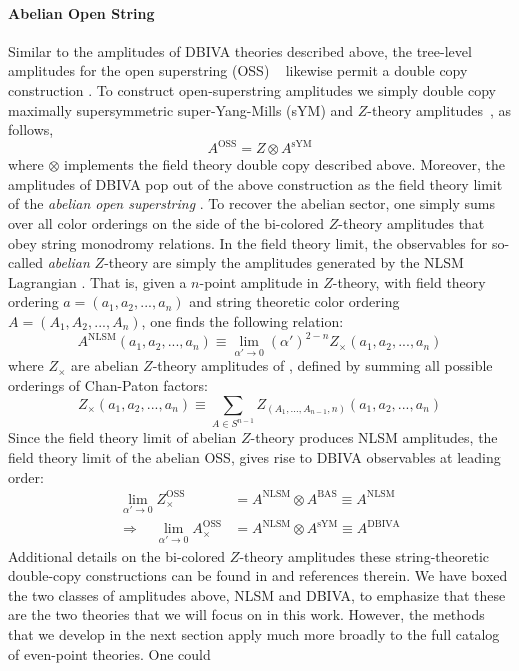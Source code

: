 \documentclass[12pt,letter]{article}
\begin{document}
\paragraph{Abelian Open String}
Similar to the amplitudes of DBIVA theories described above, the tree-level amplitudes for the open superstring (OSS) ~\cite{Mafra:2011nv,Mafra:2011nw} likewise permit a double copy construction \cite{Broedel:2013tta}. To construct open-superstring amplitudes we simply double copy maximally supersymmetric super-Yang-Mills (sYM) and $Z$-theory amplitudes~\cite{Carrasco:2016ldy,Carrasco:2016ygv,Mafra:2016mcc}, as follows,
\begin{equation}
A^{\text{OSS}}= Z \otimes A^{ \text{sYM}}
\end{equation}
where $\otimes$ implements the field theory double copy \cite{KLT, BCJ} described above. Moreover, the amplitudes of DBIVA pop out of the above construction as the field theory limit of the \textit{abelian open superstring} \cite{Green:1982sw}. To recover the abelian sector, one simply sums over all color orderings on the side of the bi-colored $Z$-theory amplitudes that obey string monodromy relations. In the field theory limit, the observables for so-called \textit{abelian} $Z$-theory are simply the amplitudes generated by the NLSM Lagrangian \cite{Carrasco:2016ldy}. That is, given a $n$-point amplitude in $Z$-theory, with field theory ordering $a=(a_1,a_2,...,a_n)$ and string theoretic color ordering $A=(A_1,A_2,...,A_n)$, one finds the following relation:
\begin{equation}
A^{\text{NLSM}}{(a_1,a_2,...,a_n)} \equiv \lim_{\alpha' \to 0} (\alpha')^{2-n}  Z_{\times}{(a_1,a_2,...,a_n)}
\end{equation}
where $Z_{\times}$ are abelian $Z$-theory amplitudes of \cite{Carrasco:2016ldy}, defined by summing all possible orderings of Chan-Paton factors:
\begin{equation}
Z_{\times}(a_1,a_2,...,a_n)\equiv \sum_{A \in S^{n-1}} Z_{(A_1,...,A_{n-1},n)}{(a_1,a_2,...,a_n)}
\end{equation}
Since the field theory limit of abelian $Z$-theory produces NLSM amplitudes, the field theory limit of the abelian OSS, gives rise to DBIVA observables at leading order:
\begin{equation}
\boxed
{\begin{aligned} 
\lim_{\alpha' \to 0 }Z^{\text{OSS}}_{\times}&= A^{\text{NLSM}} \otimes A^{\text{BAS}}\equiv A^{\text{NLSM}}
\\
\Rightarrow \quad\lim_{\alpha' \to 0 }A^{\text{OSS}}_{\times}&= A^{\text{NLSM}} \otimes A^{ \text{sYM}}\equiv A^{\text{DBIVA}}
\end{aligned}}
\end{equation}
Additional details on the bi-colored $Z$-theory amplitudes these string-theoretic double-copy constructions can be found in \cite{Broedel:2013tta,Carrasco:2016ldy,Carrasco:2016ygv,Mafra:2016mcc,Azevedo:2018dgo} and references therein. We have boxed the two classes of amplitudes above, NLSM and DBIVA, to emphasize that these are the two theories that we will focus on in this work. However, the methods that we develop in the next section apply much more broadly to the full catalog of even-point theories. One could 
\end{document}
